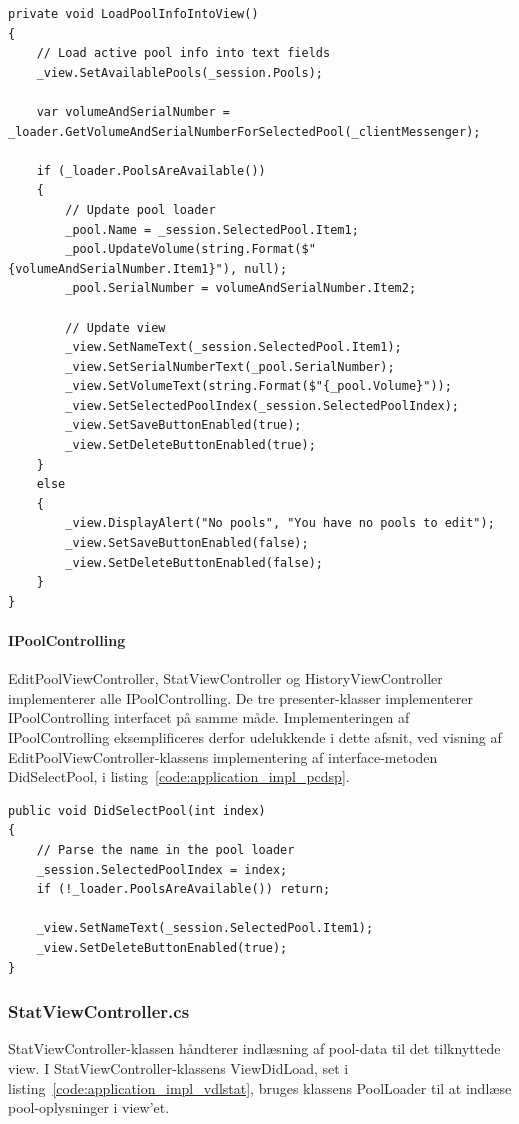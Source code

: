 \begin{lstlisting}[caption={LoadPoolInfoIntoView()},label={code:application_impl_pcdlpiiv}]
private void LoadPoolInfoIntoView()
{
	// Load active pool info into text fields
	_view.SetAvailablePools(_session.Pools);

	var volumeAndSerialNumber = _loader.GetVolumeAndSerialNumberForSelectedPool(_clientMessenger);

	if (_loader.PoolsAreAvailable())
	{
		// Update pool loader
		_pool.Name = _session.SelectedPool.Item1;
		_pool.UpdateVolume(string.Format($"{volumeAndSerialNumber.Item1}"), null);
		_pool.SerialNumber = volumeAndSerialNumber.Item2;

		// Update view
		_view.SetNameText(_session.SelectedPool.Item1);
		_view.SetSerialNumberText(_pool.SerialNumber);
		_view.SetVolumeText(string.Format($"{_pool.Volume}"));
		_view.SetSelectedPoolIndex(_session.SelectedPoolIndex);
		_view.SetSaveButtonEnabled(true);
		_view.SetDeleteButtonEnabled(true);
	}
	else
	{
		_view.DisplayAlert("No pools", "You have no pools to edit");
		_view.SetSaveButtonEnabled(false);
		_view.SetDeleteButtonEnabled(false);
	}
}
\end{lstlisting}

\paragraph{IPoolControlling}
EditPoolViewController, StatViewController og HistoryViewController implementerer alle IPoolControlling. De tre presenter-klasser implementerer IPoolControlling interfacet på samme måde. Implementeringen af IPoolControlling eksemplificeres derfor udelukkende i dette afsnit, ved visning af EditPoolViewController-klassens implementering af interface-metoden DidSelectPool, i listing~\ref{code:application_impl_pcdsp}.

\begin{lstlisting}[caption={DidSelectPool(...)},label={code:application_impl_pcdsp}]
public void DidSelectPool(int index)
{
	// Parse the name in the pool loader 
	_session.SelectedPoolIndex = index;
	if (!_loader.PoolsAreAvailable()) return;

	_view.SetNameText(_session.SelectedPool.Item1);
	_view.SetDeleteButtonEnabled(true);
}
\end{lstlisting}

\subsubsection{StatViewController.cs}
StatViewController-klassen håndterer indlæsning af pool-data til det tilknyttede view. I StatViewController-klassens ViewDidLoad, set i listing~\ref{code:application_impl_vdlstat}, bruges klassens PoolLoader til at indlæse pool-oplysninger i view'et.

